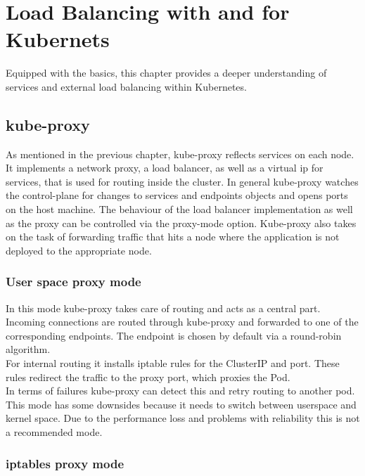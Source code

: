 \chapter{Load Balancing with and for Kubernets}

Equipped with the basics, this chapter provides a deeper understanding of services and external load balancing within Kubernetes.

\section{kube-proxy}\label{sec:kubeproxy}

As mentioned in the previous chapter, kube-proxy reflects services on each node.
It implements a network proxy, a load balancer, as well as a virtual ip for services, that is used for routing inside the cluster.
In general kube-proxy watches the control-plane for changes to services and endpoints objects and opens ports on the host machine.
The behaviour of the load balancer implementation as well as the proxy can be controlled via the proxy-mode option.
Kube-proxy also takes on the task of forwarding traffic that hits a node where the application is not deployed to the appropriate node.~\cite{KUBERNETES-SERVICE}

\subsection{User space proxy mode}

In this mode kube-proxy takes care of routing and acts as a central part.
\\
Incoming connections are routed through kube-proxy and forwarded to one of the corresponding endpoints.
The endpoint is chosen by default via a round-robin algorithm.
\\
For internal routing it installs iptable rules for the ClusterIP and port.
These rules redirect the traffic to the proxy port, which proxies the Pod.
\\
In terms of failures kube-proxy can detect this and retry routing to another pod.
\\
This mode has some downsides because it needs to switch between userspace and kernel space.
Due to the performance loss and problems with reliability this is not a recommended mode.~\cite{KUBERNETES-SERVICE}

\subsection{iptables proxy mode}

